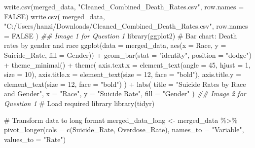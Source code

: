 \documentclass[
  letterpaper,
  DIV=11,
  numbers=noendperiod]{scrartcl}
\newenvironment{Shaded}{\begin{snugshade}}{\end{snugshade}}
\newcommand{\AttributeTok}[1]{\textcolor[rgb]{0.40,0.45,0.13}{#1}}
\newcommand{\CommentTok}[1]{\textcolor[rgb]{0.37,0.37,0.37}{#1}}
\newcommand{\ConstantTok}[1]{\textcolor[rgb]{0.56,0.35,0.01}{#1}}
\newcommand{\DecValTok}[1]{\textcolor[rgb]{0.68,0.00,0.00}{#1}}
\newcommand{\DocumentationTok}[1]{\textcolor[rgb]{0.37,0.37,0.37}{\textit{#1}}}
\newcommand{\FunctionTok}[1]{\textcolor[rgb]{0.28,0.35,0.67}{#1}}
\newcommand{\NormalTok}[1]{\textcolor[rgb]{0.00,0.23,0.31}{#1}}
\newcommand{\OtherTok}[1]{\textcolor[rgb]{0.00,0.23,0.31}{#1}}
\newcommand{\SpecialCharTok}[1]{\textcolor[rgb]{0.37,0.37,0.37}{#1}}
\newcommand{\StringTok}[1]{\textcolor[rgb]{0.13,0.47,0.30}{#1}}
\begin{document}
\begin{Shaded}
\begin{Highlighting}[]
\FunctionTok{write.csv}\NormalTok{(merged\_data, }\StringTok{"Cleaned\_Combined\_Death\_Rates.csv"}\NormalTok{, }\AttributeTok{row.names =} \ConstantTok{FALSE}\NormalTok{)}
\FunctionTok{write.csv}\NormalTok{(}
\NormalTok{  merged\_data,}
  \StringTok{"C:/Users/hanzi/Downloads/Cleaned\_Combined\_Death\_Rates.csv"}\NormalTok{,}
  \AttributeTok{row.names =} \ConstantTok{FALSE}
\NormalTok{)}
\DocumentationTok{\#\# Image 1 for Question 1}
\FunctionTok{library}\NormalTok{(ggplot2)}
\CommentTok{\# Bar chart: Death rates by gender and race}
\FunctionTok{ggplot}\NormalTok{(}\AttributeTok{data =}\NormalTok{ merged\_data, }\FunctionTok{aes}\NormalTok{(}\AttributeTok{x =}\NormalTok{ Race, }\AttributeTok{y =}\NormalTok{ Suicide\_Rate, }\AttributeTok{fill =}\NormalTok{ Gender)) }\SpecialCharTok{+}
  \FunctionTok{geom\_bar}\NormalTok{(}\AttributeTok{stat =} \StringTok{"identity"}\NormalTok{, }\AttributeTok{position =} \StringTok{"dodge"}\NormalTok{) }\SpecialCharTok{+}
  \FunctionTok{theme\_minimal}\NormalTok{() }\SpecialCharTok{+}
  \FunctionTok{theme}\NormalTok{(}
    \AttributeTok{axis.text.x =} \FunctionTok{element\_text}\NormalTok{(}\AttributeTok{angle =} \DecValTok{45}\NormalTok{, }\AttributeTok{hjust =} \DecValTok{1}\NormalTok{, }\AttributeTok{size =} \DecValTok{10}\NormalTok{),}
    \AttributeTok{axis.title.x =} \FunctionTok{element\_text}\NormalTok{(}\AttributeTok{size =} \DecValTok{12}\NormalTok{, }\AttributeTok{face =} \StringTok{"bold"}\NormalTok{),}
    \AttributeTok{axis.title.y =} \FunctionTok{element\_text}\NormalTok{(}\AttributeTok{size =} \DecValTok{12}\NormalTok{, }\AttributeTok{face =} \StringTok{"bold"}\NormalTok{)}
\NormalTok{  ) }\SpecialCharTok{+}
  \FunctionTok{labs}\NormalTok{(}
    \AttributeTok{title =} \StringTok{"Suicide Rates by Race and Gender"}\NormalTok{,}
    \AttributeTok{x =} \StringTok{"Race"}\NormalTok{,}
    \AttributeTok{y =} \StringTok{"Suicide Rate"}\NormalTok{,}
    \AttributeTok{fill =} \StringTok{"Gender"}
\NormalTok{  )}
\DocumentationTok{\#\# Image 2 for Question 1}
\CommentTok{\# Load required library}
\FunctionTok{library}\NormalTok{(tidyr)}

\CommentTok{\# Transform data to long format}
\NormalTok{merged\_data\_long }\OtherTok{\textless{}{-}}\NormalTok{ merged\_data }\SpecialCharTok{\%\textgreater{}\%}
  \FunctionTok{pivot\_longer}\NormalTok{(}\AttributeTok{cols =} \FunctionTok{c}\NormalTok{(Suicide\_Rate, Overdose\_Rate), }
               \AttributeTok{names\_to =} \StringTok{"Variable"}\NormalTok{, }
               \AttributeTok{values\_to =} \StringTok{"Rate"}\NormalTok{)}


\end{Highlighting}
\end{Shaded}
\end{document}
